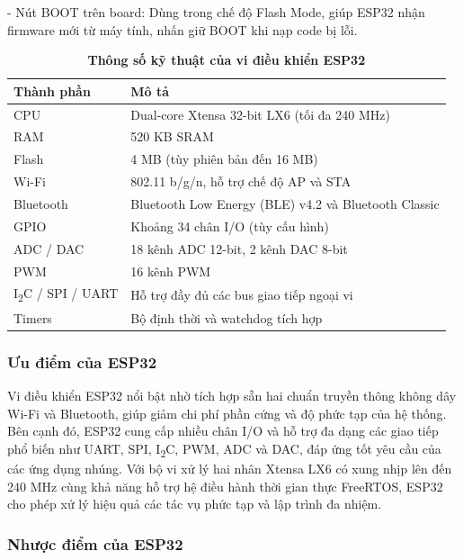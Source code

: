 \documentclass{article}
\begin{document}
	- Nút BOOT trên board: Dùng trong chế độ Flash Mode, giúp ESP32 nhận firmware mới từ máy tính, nhấn giữ BOOT khi nạp code bị lỗi. 
	
	\begin{table}[H]
		\caption[Thông số kỹ thuật của vi điều khiển ESP32]{\bfseries \fontsize{12pt}{0pt}\selectfont Thông số kỹ thuật của vi điều khiển ESP32}
		\label{tab21}
		\centering
		\begin{tabular}{|p{3.5cm}|p{11cm}|}
			\hline
			\textbf{Thành phần} & \textbf{Mô tả} \\ 
			\hline
			CPU & Dual-core Xtensa 32-bit LX6 (tối đa 240 MHz) \\ 
			\hline
			RAM & 520 KB SRAM \\ 
			\hline
			Flash & 4 MB (tùy phiên bản đến 16 MB) \\ 
			\hline
			Wi-Fi & 802.11 b/g/n, hỗ trợ chế độ AP và STA \\ 
			\hline
			Bluetooth & Bluetooth Low Energy (BLE) v4.2 và Bluetooth Classic \\ 
			\hline
			GPIO & Khoảng 34 chân I/O (tùy cấu hình) \\ 
			\hline
			ADC / DAC & 18 kênh ADC 12-bit, 2 kênh DAC 8-bit \\ 
			\hline
			PWM & 16 kênh PWM \\ 
			\hline
			I\textsubscript{2}C / SPI / UART & Hỗ trợ đầy đủ các bus giao tiếp ngoại vi \\ 
			\hline
			Timers & Bộ định thời và watchdog tích hợp \\ 
			\hline
		\end{tabular}
	\end{table}
	
	\subsubsection{Ưu điểm của ESP32}
	
	Vi điều khiển ESP32 nổi bật nhờ tích hợp sẵn hai chuẩn truyền thông không dây Wi-Fi và Bluetooth, giúp giảm chi phí phần cứng và độ phức tạp của hệ thống. Bên cạnh đó, ESP32 cung cấp nhiều chân I/O và hỗ trợ đa dạng các giao tiếp phổ biến như UART, SPI, I\textsubscript{2}C, PWM, ADC và DAC, đáp ứng tốt yêu cầu của các ứng dụng nhúng. Với bộ vi xử lý hai nhân Xtensa LX6 có xung nhịp lên đến 240 MHz cùng khả năng hỗ trợ hệ điều hành thời gian thực FreeRTOS, ESP32 cho phép xử lý hiệu quả các tác vụ phức tạp và lập trình đa nhiệm. 
	
	\subsubsection{Nhược điểm của ESP32}
	
\end{document}
